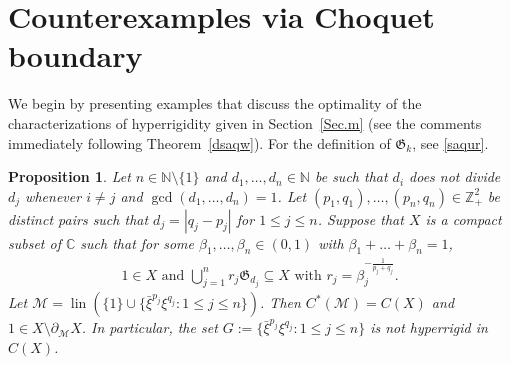 \documentclass[reqno]{amsproc}
\DeclareMathOperator{\lin}{lin}
\numberwithin{equation}{section}
\newtheorem{prop}[theorem]{Proposition}
\theoremstyle{remark}
\newcommand*{\natu}{\mathbb{N}}
\newcommand*{\mcal}{\mathcal{M}}
\newcommand*{\comp}{\mathbb{C}}
\newcommand*{\cbb}{\comp}
\theoremstyle{definition}
\newcommand*{\Le}{\leqslant}
\newcommand*{\zbb}{\mathbb{Z}}
\begin{document}
   \section{\label{Sec.9}Counterexamples via Choquet boundary}
We begin by presenting examples that discuss the
optimality of the characterizations of hyperrigidity
given in Section~\ref{Sec.m} (see the comments
immediately following Theorem~\ref{dsaqw}). For the
definition of $\mathfrak{G}_k$, see \eqref{saqur}.
   \begin{prop} \label{isnytos}
Let $n\in \natu\setminus \{1\}$ and $d_1, \ldots, d_n
\in \natu$ be such that $d_i$ does not divide $d_j$
whenever $i\neq j$ and $\gcd(d_1, \ldots, d_n)=1$. Let
$(p_1,q_1), \ldots, (p_n,q_n) \in \zbb_+^2$ be
distinct pairs such that $d_j = |q_j-p_j|$ for $1 \Le
j \Le n$. Suppose that $X$ is a compact subset of
$\cbb$ such that for some $\beta_1, \ldots, \beta_n
\in (0,1)$ with $\beta_1 + \ldots + \beta_n=1$,
   \begin{align} \label{porea}
1 \in X \text{ and } \bigcup_{j=1}^n r_j
\mathfrak{G}_{d_j} \subseteq X \text{ with }
r_j=\beta_j^{-\frac{1}{p_j+q_j}}.
   \end{align}
Let $\mcal=\lin(\{1\} \cup \{\bar{\xi}^{p_j}
\xi^{q_j}\colon 1 \Le j \Le n\})$. Then
$C^*(\mcal)=C(X)$ and $1\in X \setminus
\partial_{\mcal} X$. In particular, the set
$G:= \{\bar{\xi}^{p_j} \xi^{q_j}\colon 1 \Le j \Le
n\}$ is not hyperrigid in $C(X)$.
   \end{prop}
\end{document}
